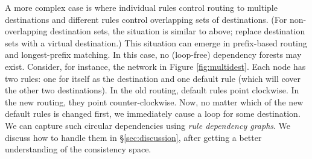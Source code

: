 A more complex case is where individual rules control routing to multiple destinations and different rules control overlapping sets of destinations. (For non-overlapping destination sets, the situation is similar to above; replace destination sets with a virtual destination.) This situation can emerge in prefix-based routing and longest-prefix matching. In this case, no (loop-free) dependency forests may exist. Consider, for instance, the network in Figure \ref{fig:multidest}. Each node has two rules: one for itself as the destination and one default rule (which will cover the other two destinations).  In the old routing, default rules point clockwise. In the new routing, they point counter-clockwise. Now, no matter which of the new default rules is changed first, we immediately cause a loop for some destination. We can capture such circular dependencies using {\em rule dependency graphs}. We discuss how to handle them in \S\ref{sec:discussion}, after getting a better understanding of the consistency space.






